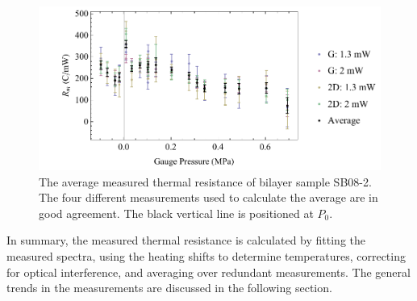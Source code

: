 \begin{figure}
	\begin{center}
	\includegraphics[scale=0.8]{Figs_Thermal/R_average.pdf}
	\end{center}
	\caption[Average pressure dependence of the measured thermal resistance]{\label{fig:therm:R_average}
		The average measured thermal resistance of bilayer sample SB08-2.
		The four different measurements used to calculate the average are in good agreement.
		The black vertical line is positioned at $P_0$.
	}
\end{figure}

In summary, the measured thermal resistance is calculated by fitting the measured spectra, using the heating shifts to determine temperatures, correcting for optical interference, and averaging over redundant measurements.
The general trends in the measurements are discussed in the following section.


